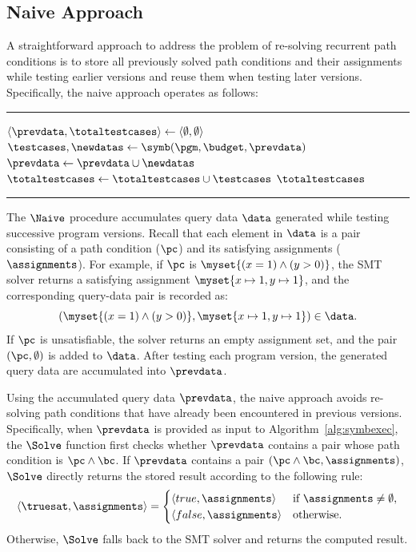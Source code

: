 \subsection{Naive Approach}\label{sec:naive}
A straightforward approach to address the problem of re-solving recurrent path conditions is to store all previously solved path conditions and their assignments while testing earlier versions and reuse them when testing later versions. Specifically, the naive approach operates as follows:

\vspace{0.5em} \hrule
\begin{algorithmic}[1]\footnotesize
\Procedure{{\Naive}}{$\programs, \budget$}
    \State $\langle \prevdata, \totaltestcases \rangle \gets \langle \emptyset, \emptyset \rangle$
        \State $\testcases, \newdatas \gets \symb(\pgm, \budget, \prevdata)$   
        \State $\prevdata \gets \prevdata \cup \newdatas$   \Comment{$(\pc, \assignments) \in \newdatas$}
        \State $\totaltestcases \gets \totaltestcases \cup \testcases$
    \EndFor
    \State \Return $\totaltestcases$
    \EndProcedure
\end{algorithmic}
\hrule
\vspace{0.5em}
The $\Naive$ procedure accumulates query data $\data$ generated while testing successive program versions. Recall that each element in $\data$ is a pair consisting of a path condition ($\pc$) and its satisfying assignments ($\assignments$). For example, if $\pc$ is $\myset{(x = 1) \land (y > 0)}$, the SMT solver returns a satisfying assignment $\myset{x \mapsto 1, y \mapsto 1}$, and the corresponding query-data pair is recorded as:
\[
(\myset{(x = 1) \land (y > 0)}, \myset{x \mapsto 1, y \mapsto 1}) \in \data.
\]
If $\pc$ is unsatisfiable, the solver returns an empty assignment set, and the pair $(\pc,\emptyset)$ is added to $\data$. After testing each program version, the generated query data are accumulated into $\prevdata$.

Using the accumulated query data $\prevdata$, the naive approach avoids re-solving path conditions that have already been encountered in previous versions. Specifically, when $\prevdata$ is provided as input to Algorithm~\ref{alg:symbexec}, the $\Solve$ function first checks whether $\prevdata$ contains a pair whose path condition is $\pc \wedge \bc$. If $\prevdata$ contains a pair $(\pc \wedge \bc,\assignments)$, $\Solve$ directly returns the stored result according to the following rule:
\[
\langle \truesat,\assignments\rangle =
\begin{cases}
\langle true,\assignments\rangle
& \text{if } \assignments \neq \emptyset,\\
\langle false,\assignments\rangle
& \text{otherwise}.
\end{cases}
\]
Otherwise, $\Solve$ falls back to the SMT solver and returns the computed result.


